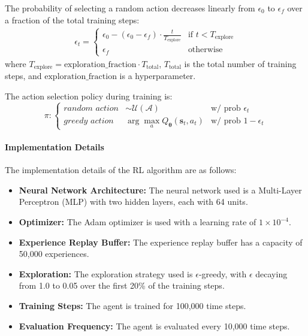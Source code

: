 The probability of selecting a random action decreases linearly from $\epsilon_0$ to $\epsilon_f$ over a fraction of the total training steps:
\begin{align}
\epsilon_t = 
\begin{cases}
\epsilon_0 - (\epsilon_0 - \epsilon_f) \cdot \frac{t}{T_{\text{explore}}} & \text{if } t < T_{\text{explore}} \\
\epsilon_f & \text{otherwise}
\end{cases}
\end{align}
where $T_{\text{explore}} = \text{exploration\_fraction} \cdot T_{\text{total}}$, $T_{\text{total}}$ is the total number of training steps, and $\text{exploration\_fraction}$ is a hyperparameter.

The action selection policy during training is:
$$
\pi: 
\left\{
\begin{array}{lll}
\textit{random action}
& \sim \mathcal{U}(\mathcal{A}) 
& \text{w/ prob } \epsilon_t 
\\
\textit{greedy action}
& \arg\max_{a} Q_{\boldsymbol \theta}(\mathbf s_t, a_t) 
& \text{w/ prob } 1-\epsilon_t
\end{array}
\right.
$$




\paragraph{Implementation Details}

The implementation details of the RL algorithm are as follows:

\begin{itemize}
    \item \textbf{Neural Network Architecture:} The neural network used is a Multi-Layer Perceptron (MLP) with two hidden layers, each with 64 units.
    \item \textbf{Optimizer:} The Adam optimizer is used with a learning rate of $1 \times 10^{-4}$.
    \item \textbf{Experience Replay Buffer:} The experience replay buffer has a capacity of 50,000 experiences.
    \item \textbf{Exploration:} The exploration strategy used is $\epsilon$-greedy, with $\epsilon$ decaying from 1.0 to 0.05 over the first 20\% of the training steps.
    \item \textbf{Training Steps:} The agent is trained for 100,000 time steps.
    \item \textbf{Evaluation Frequency:} The agent is evaluated every 10,000 time steps.
\end{itemize}

